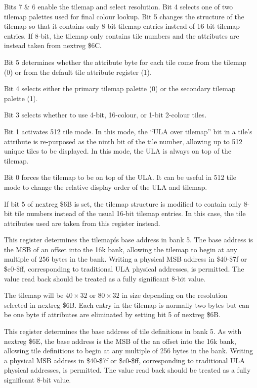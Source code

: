 Bits 7 \& 6 enable the tilemap and select resolution. Bit 4 selects one
of two tilemap palettes used for final colour lookup. Bit 5 changes
the structure of the tilemap so that it contains only 8-bit tilemap
entries instead of 16-bit tilemap entries. If 8-bit, the tilemap only
contains tile numbers and the attributes are instead taken from
nextreg \$6C.

Bit 5 determines whether the attribute byte for each tile come from
the tilemap (0) or from the default tile attribute register (1).

Bit 4 selects either the primary tilemap palette (0) or the secondary
tilemap palette (1).

Bit 3 selects whether to use 4-bit, 16-colour, or 1-bit 2-colour
tiles.

Bit 1 activates 512 tile mode. In this mode, the “ULA over tilemap”
bit in a tile’s attribute is re-purposed as the ninth bit of the tile
number, allowing up to 512 unique tiles to be displayed. In this mode,
the ULA is always on top of the tilemap.

Bit 0 forces the tilemap to be on top of the ULA. It can be useful in
512 tile mode to change the relative display order of the ULA and
tilemap.



If bit 5 of nextreg \$6B is set, the tilemap structure is modified to
contain only 8-bit tile numbers instead of the usual 16-bit tilemap
entries. In this case, the tile attributes used are taken from this
register instead.



This register determines the tilemapís base address in bank 5. The
base address is the MSB of an offset into the 16k bank, allowing the
tilemap to begin at any multiple of 256 bytes in the bank. Writing a
physical MSB address in \$40-\$7f or \$c0-\$ff, corresponding to
traditional ULA physical addresses, is permitted. The value read back
should be treated as a fully significant 8-bit value.

The tilemap will be $40\times32$ or $80\times32$ in size depending on
the resolution selected in nextreg \$6B. Each entry in the tilemap is
normally two bytes but can be one byte if attributes are eliminated by
setting bit 5 of nextreg \$6B.



This register determines the base address of tile definitions in bank
5. As with nextreg \$6E, the base address is the MSB of the an offset
into the 16k bank, allowing tile definitions to begin at any multiple
of 256 bytes in the bank. Writing a physical MSB address in \$40-\$7f
or \$c0-\$ff, corresponding to traditional ULA physical addresses, is
permitted. The value read back should be treated as a fully
significant 8-bit value.

